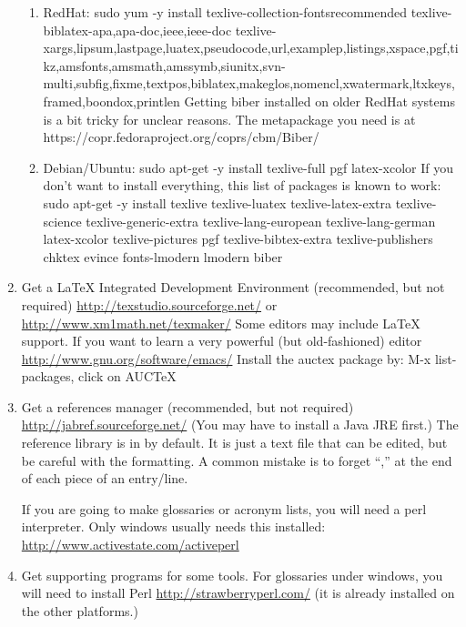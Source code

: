 \begin{enumerate}
   \begin{enumerate}
   \item RedHat: sudo yum -y install
     texlive-collection-fontsrecommended
     texlive-biblatex-{apa,apa-doc,ieee,ieee-doc}
     texlive-{xargs,lipsum,lastpage,luatex,pseudocode,url,examplep,listings,xspace,pgf,tikz,amsfonts,amsmath,amssymb,siunitx,svn-multi,subfig,fixme,textpos,biblatex,makeglos,nomencl,xwatermark,ltxkeys,framed,boondox,printlen}
     Getting biber installed on older RedHat systems is a bit tricky
     for unclear reasons.  The metapackage you need is at
     https://copr.fedoraproject.org/coprs/cbm/Biber/ 
   \item Debian/Ubuntu:
     sudo apt-get -y install texlive-full pgf latex-xcolor
     If you don't want to install everything, this list of packages is known
     to work: sudo apt-get -y install texlive texlive-luatex texlive-latex-extra
     texlive-science texlive-generic-extra texlive-lang-european
     texlive-lang-german latex-xcolor texlive-pictures pgf
     texlive-bibtex-extra texlive-publishers chktex evince
     fonts-lmodern lmodern biber
   \end{enumerate}
 \item Get a LaTeX Integrated Development Environment (recommended, but not required)
   \url{http://texstudio.sourceforge.net/} or
   \url{http://www.xm1math.net/texmaker/}
   Some editors may include LaTeX support.
   If you want to learn a very powerful (but old-fashioned) editor \url{http://www.gnu.org/software/emacs/}
      Install the auctex package by: M-x list-packages, click on AUCTeX

    \item Get a references manager (recommended, but not required)\label{list:refmanager}
   \url{http://jabref.sourceforge.net/}  (You may have to install a Java JRE first.)
   The reference library is in  by default.
   It is just a text file that can be edited, but be careful with the formatting.
   A common mistake is to forget ``,'' at the end of each piece of an entry/line.

   If you are going to make glossaries or acronym lists, you will need
   a perl interpreter.  Only windows usually needs this installed:
   \url{http://www.activestate.com/activeperl}

 \item Get supporting programs for some tools.
   For glossaries under windows, you will need to install Perl
   \url{http://strawberryperl.com/}
   (it is already installed on the other platforms.)
   

\end{enumerate}
